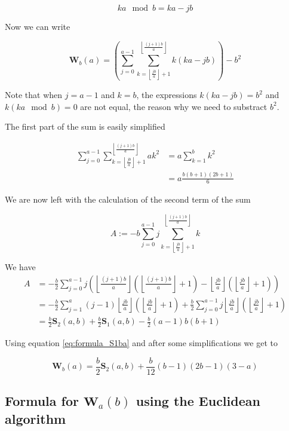 \documentclass{article}%
\newcommand{\ENT}[1]{ \left\lfloor #1 \right\rfloor}
\newcommand{\Efrac}[2]{\ENT{\frac{#1}{#2}}}
\newcommand{\SUMS}[3]{\mathbf{S}_{#1}\left(#2,#3\right)}
\newcommand{\SUMW}[2]{\mathbf{W}_{#1}\left(#2\right)}
\begin{document}
\begin{equation*}
ka\mod b = ka-jb 
\end{equation*}

Now we can write

\begin{equation*}
\SUMW{b}{a} = \left( \sum_{j=0}^{a-1}\sum_{k=\Efrac{jb}{a}+1}^{\Efrac{(j+1)b}{a}}k(ka-jb) \right) - b^2
\end{equation*}

Note that when $j=a-1$ and $k=b$, the expressions $k(ka-jb)=b^2$ and $k(ka\mod b)=0$ are not equal, the reason why we need to substract $b^2$.

The first part of the sum is easily simplified

\begin{align*}
\sum_{j=0}^{a-1}\sum_{k=\Efrac{jb}{a}+1}^{\Efrac{(j+1)b}{a}}ak^2 
&= a \sum_{k=1}^{b}k^2 \\
&= a \frac{b(b+1)(2b+1)}{6}
\end{align*}

We are now left with the calculation of the second term of the sum 

\begin{equation*}
A:=-b \sum_{j=0}^{a-1} j \sum_{k=\Efrac{jb}{a}+1}^{\Efrac{(j+1)b}{a}}k
\end{equation*}

We have
\begin{align*}
A
&= -\frac{b}{2}\sum_{j=0}^{a-1}j\left( \Efrac{(j+1)b}{a}\left(\Efrac{(j+1)b}{a}+1\right)-\Efrac{jb}{a}\left(\Efrac{jb}{a}+1\right) \right) \\
&= -\frac{b}{2}\sum_{j=1}^{a}(j-1) \Efrac{jb}{a}\left(\Efrac{jb}{a}+1\right)+\frac{b}{2}\sum_{j=0}^{a-1}j\Efrac{jb}{a}\left(\Efrac{jb}{a}+1\right) \\
&= \frac{b}{2}\SUMS{2}{a}{b}+\frac{b}{2}\SUMS{1}{a}{b} - \frac{b}{2}(a-1)b(b+1)
\end{align*}

Using equation \ref{eq:formula_S1ba} and after some simplifications we get to

\begin{equation}\label{eq:rel_Wba_S2ab}
\SUMW{b}{a} = \frac{b}{2}\SUMS{2}{a}{b} + \frac{b}{12}(b-1)(2b-1)(3-a)
\end{equation}

\subsection{Formula for $\SUMW{a}{b}$ using the Euclidean algorithm}\label{sec:Wab_Euclidean_algorithm}
\end{document}
